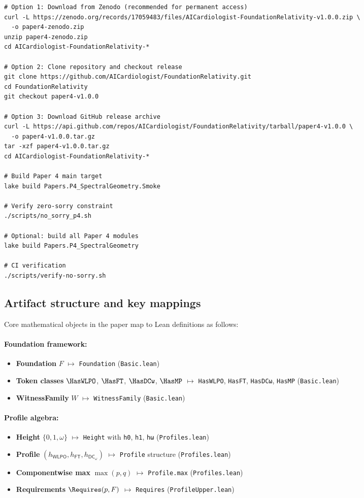 \documentclass[11pt]{article}
\newcommand{\WLPO}{\mathsf{WLPO}}
\newcommand{\FT}{\mathsf{FT}}
\newcommand{\DCw}{\mathsf{DC}_{\omega}}
\newcommand{\lean}[1]{\texttt{#1}}
\theoremstyle{plain}
\theoremstyle{definition}
\theoremstyle{remark}
\begin{document}
\begin{verbatim}
# Option 1: Download from Zenodo (recommended for permanent access)
curl -L https://zenodo.org/records/17059483/files/AICardiologist-FoundationRelativity-v1.0.0.zip \
  -o paper4-zenodo.zip
unzip paper4-zenodo.zip
cd AICardiologist-FoundationRelativity-*

# Option 2: Clone repository and checkout release
git clone https://github.com/AICardiologist/FoundationRelativity.git
cd FoundationRelativity
git checkout paper4-v1.0.0

# Option 3: Download GitHub release archive
curl -L https://api.github.com/repos/AICardiologist/FoundationRelativity/tarball/paper4-v1.0.0 \
  -o paper4-v1.0.0.tar.gz
tar -xzf paper4-v1.0.0.tar.gz
cd AICardiologist-FoundationRelativity-*

# Build Paper 4 main target
lake build Papers.P4_SpectralGeometry.Smoke

# Verify zero-sorry constraint
./scripts/no_sorry_p4.sh

# Optional: build all Paper 4 modules
lake build Papers.P4_SpectralGeometry

# CI verification
./scripts/verify-no-sorry.sh
\end{verbatim}

\subsection{Artifact structure and key mappings}
Core mathematical objects in the paper map to Lean definitions as follows:

\paragraph{Foundation framework:}
\begin{itemize}
\item \textbf{Foundation} $F$ $\mapsto$ \lean{Foundation} (\texttt{Basic.lean})
\item \textbf{Token classes} $\HasWLPO$, $\HasFT$, $\HasDCw$, $\HasMP$ $\mapsto$ \lean{HasWLPO}, \lean{HasFT}, \lean{HasDCω}, \lean{HasMP} (\texttt{Basic.lean})
\item \textbf{WitnessFamily} $W$ $\mapsto$ \lean{WitnessFamily} (\texttt{Basic.lean})
\end{itemize}

\paragraph{Profile algebra:}
\begin{itemize}
\item \textbf{Height} $\{0,1,\omega\}$ $\mapsto$ \lean{Height} with \lean{h0}, \lean{h1}, \lean{hω} (\texttt{Profiles.lean})
\item \textbf{Profile} $(h_{\WLPO}, h_{\FT}, h_{\DCw})$ $\mapsto$ \lean{Profile} structure (\texttt{Profiles.lean})
\item \textbf{Componentwise max} $\max(p,q)$ $\mapsto$ \lean{Profile.max} (\texttt{Profiles.lean})
\item \textbf{Requirements} $\Requires(p,F)$ $\mapsto$ \lean{Requires} (\texttt{ProfileUpper.lean})
\end{itemize}
\end{document}
